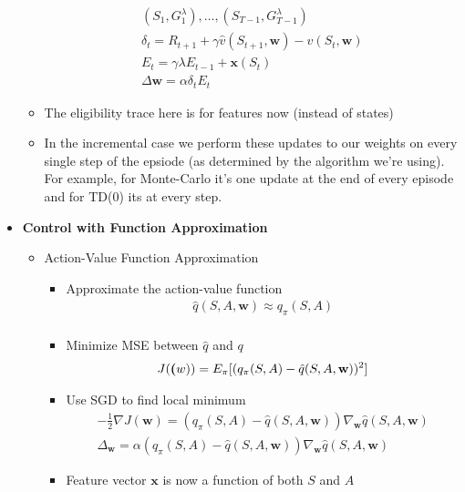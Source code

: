 \documentclass[12pt]{article}
\begin{document}
\begin{itemize}
\begin{itemize}
      \begin{gather*}
        (S_1, G_1^\lambda), \dots, (S_{T-1}, G_{T-1}^\lambda) \\
        \delta_t = R_{t+1} + \gamma \hat{v}(S_{t+1}, \textbf{w}) - \hat{v}(S_t, \textbf{w}) \\
        E_t = \gamma \lambda E_{t-1} + \textbf{x}(S_t) \\
        \Delta \textbf{w} = \alpha \delta_t E_t
      \end{gather*}
      \item The eligibility trace here is for features now (instead of states)
      \item In the incremental case we perform these updates to our weights on every single
      step of the epsiode (as determined by the algorithm we're using). For example, for Monte-Carlo
      it's one update at the end of every episode and for TD(0) its at every step.
    \end{itemize}
    \item \textbf{Control with Function Approximation}
    \begin{itemize}
      \item Action-Value Function  Approximation
      \begin{itemize}
        \item Approximate the action-value function
        \begin{gather*}
          \hat{q}(S, A, \textbf{w}) \approx q_\pi(S, A) \\
        \end{gather*}
        \item Minimize MSE between $\hat{q}$ and $q$
        \begin{gather*}
          J(\textbf(w)) = E_\pi[(q_\pi(S, A) - \hat{q}(S, A, \textbf{w}))^2]
        \end{gather*}
        \item Use SGD to find local minimum
        \begin{gather*}
          -\frac{1}{2}\nabla J(\textbf{w}) = (q_\pi(S, A) - \hat{q}(S, A, \textbf{w}))\nabla_{\textbf{w}}\hat{q}(S, A, \textbf{w}) \\
          \Delta_{\textbf{w}} = \alpha (q_\pi(S, A) - \hat{q}(S, A, \textbf{w}))\nabla_{\textbf{w}}\hat{q}(S, A, \textbf{w})
        \end{gather*}
        \item Feature vector $\textbf{x}$ is now a function of both $S$ and $A$
      \end{itemize}

\end{itemize}
\end{itemize}
\end{document}
